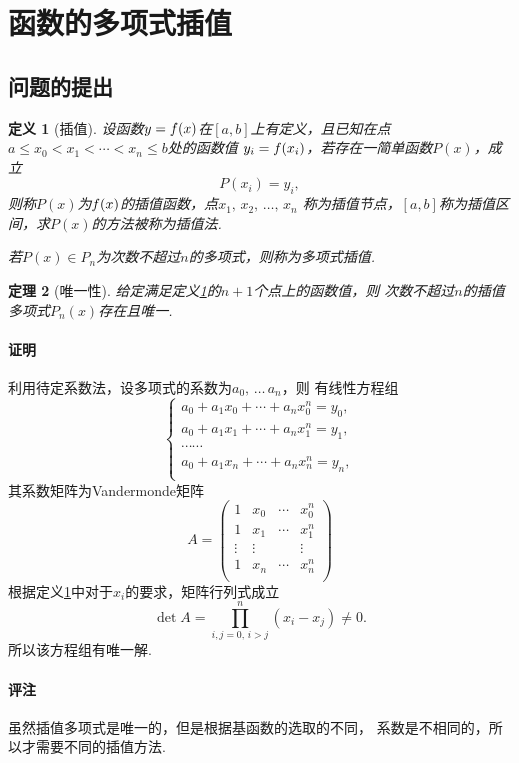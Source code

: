 \documentclass[12pt, a4paper]{article}
\theoremstyle{margin}
\newtheorem{thm}{定理}
\newtheorem{defi}[thm]{定义}
\newcommand{\f}{\mathnormal{f}}
\newcommand\defref[1]{定义\ref{#1}}
\newcommand{\remark}{\paragraph{评注}}
\newcommand{\proof}{\paragraph{证明}}
\begin{document}
\newpage
\section{函数的多项式插值}
\subsection{问题的提出}
  \begin{defi}[插值]
    \label{defi: 插值}
    设函数$y = \f(x)$在$[a, b]$上有定义，且已知在点
    $a\le x_0 < x_1 < \cdots < x_n \le b$处的函数值
    $y_i = \f(x_i)$，若存在一简单函数$P(x)$，成立
    \[
      P(x_i) = y_i,
    \]
    则称$P(x)$为$\f(x)$的插值函数，点$x_1,\,x_2,\,\dots,\,x_n$
    称为插值节点，$[a, b]$称为插值区间，求$P(x)$的方法被称为插值法. \par
    若$P(x) \in P_n$为次数不超过$n$的多项式，则称为多项式插值.
  \end{defi}

  \begin{thm}[唯一性]
    给定满足\defref{defi: 插值}的$n+1$个点上的函数值，则
    次数不超过$n$的插值多项式$P_n(x)$存在且唯一.
  \end{thm}
  \proof
    利用待定系数法，设多项式的系数为$a_0,\,\dots\,a_n$，则
    有线性方程组
    \[
      \left\{
      \begin{gathered}
          a_0 + a_1x_0 + \cdots + a_nx_0^n = y_0,\\
          a_0 + a_1x_1 + \cdots + a_nx_1^n = y_1,\\
          \cdots\cdots \\
          a_0 + a_1x_n + \cdots + a_nx_n^n = y_n,\\
      \end{gathered}
      \right.
    \]
    其系数矩阵为Vandermonde矩阵
    \[
      A =
      \begin{pmatrix}
        1 & x_0 & \cdots & x_0^n \\
        1 & x_1 & \cdots & x_1^n \\
        \vdots & \vdots & & \vdots \\
        1 & x_n & \cdots & x_n^n \\
      \end{pmatrix}
    \]
    根据\defref{defi: 插值}中对于$x_i$的要求，矩阵行列式成立
    \[
      \det A = \prod_{i,j=0,\,i>j}^n (x_i - x_j) \ne 0.
    \]
    所以该方程组有唯一解.
  \remark
    虽然插值多项式是唯一的，但是根据基函数的选取的不同，
    系数是不相同的，所以才需要不同的插值方法.
\end{document}
